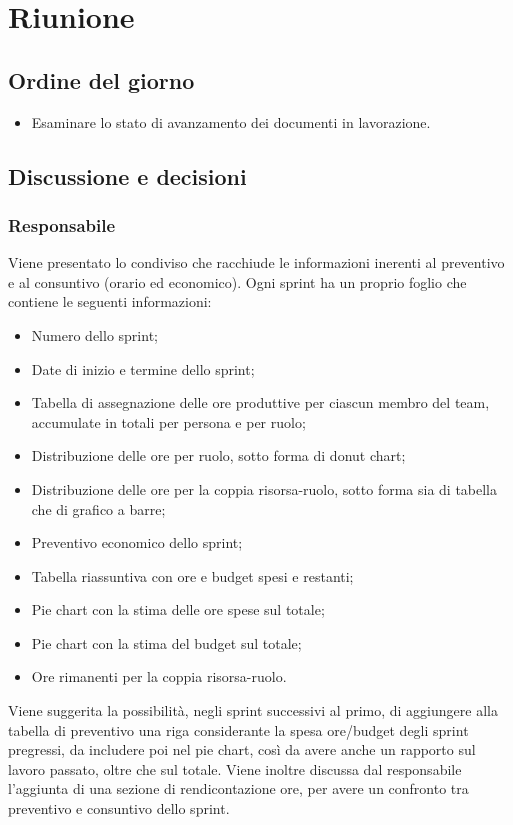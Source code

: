 \section{Riunione}
\subsection{Ordine del giorno}
\begin{itemize}
	\item Esaminare lo stato di avanzamento dei documenti in lavorazione.
\end{itemize}

\subsection{Discussione e decisioni}

\subsubsection{Responsabile}
Viene presentato lo  condiviso che racchiude le informazioni inerenti al preventivo e al consuntivo (orario ed economico). Ogni sprint ha un proprio foglio che contiene le seguenti informazioni:
\begin{itemize}
	\item Numero dello sprint;
	\item Date di inizio e termine dello sprint;
	\item Tabella di assegnazione delle ore produttive per ciascun membro del team, accumulate in totali per persona e per ruolo;
	\item Distribuzione delle ore per ruolo, sotto forma di donut chart;
	\item Distribuzione delle ore per la coppia risorsa-ruolo, sotto forma sia di tabella che di grafico a barre;
	\item Preventivo economico dello sprint;
	\item Tabella riassuntiva con ore e budget spesi e restanti;
	\item Pie chart con la stima delle ore spese sul totale;
	\item Pie chart con la stima del budget sul totale;
	\item Ore rimanenti per la coppia risorsa-ruolo.
\end{itemize}

\vspace{0.5\baselineskip}
Viene suggerita la possibilità, negli sprint successivi al primo, di aggiungere alla tabella di preventivo una riga considerante la spesa ore/budget degli sprint pregressi, da includere poi nel pie chart, così da avere anche un rapporto sul lavoro passato, oltre che sul totale. Viene inoltre discussa dal responsabile l'aggiunta di una sezione di rendicontazione ore, per avere un confronto tra preventivo e consuntivo dello sprint.

